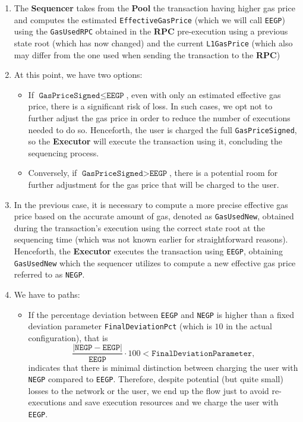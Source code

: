 \begin{enumerate}

\item The \textbf{Sequencer} takes from the \textbf{Pool} the transaction having higher gas price and computes the estimated \texttt{EffectiveGasPrice} (which we will call \texttt{EEGP}) using the \texttt{GasUsedRPC} obtained in the \textbf{RPC} pre-execution using a previous state root (which has now changed) and the current \texttt{L1GasPrice} (which also may differ from the one used when sending the transaction to the \textbf{RPC})

\item At this point, we have two options:

\begin{itemize}

\item If $\texttt{GasPriceSigned} \leq \texttt{EEGP}$, even with only an estimated effective gas price, there is a significant risk of loss. In such cases, we opt not to further adjust the gas price in order to reduce the number of executions needed to do so. Henceforth, the user is charged the full \texttt{GasPriceSigned}, so the \textbf{Executor} will execute the transaction using it, concluding the sequencing process.

\item Conversely, if $\texttt{GasPriceSigned} > \texttt{EEGP}$, there is a potential room for further adjustment for the gas price that will be charged to the user.

\end{itemize}

\item In the previous case, it is necessary to compute a more precise effective gas price based on the accurate amount of gas, denoted as \texttt{GasUsedNew}, obtained during the transaction's execution using the correct state root at the sequencing time (which was not known earlier for straightforward reasons). Henceforth, the \textbf{Executor} executes the transaction using \texttt{EEGP}, obtaining \texttt{GasUsedNew} which the sequencer utilizes to compute a new effective gas price referred to as \texttt{NEGP}.

\item We have to paths:

\begin{itemize}

\item If the percentage deviation between \texttt{EEGP} and \texttt{NEGP} is higher than a fixed deviation parameter \texttt{FinalDeviationPct} (which is $10$ in the actual configuration), that is
\[
\frac{\vert \texttt{NEGP} - \texttt{EEGP} \vert}{\texttt{EEGP}} \cdot 100 < \texttt{FinalDeviationParameter},
\]
indicates that there is minimal distinction between charging the user with \texttt{NEGP} compared to \texttt{EEGP}. Therefore, despite potential (but quite small) losses to the network or the user, we end up the flow just to avoid re-executions and save execution resources and we charge the user with \texttt{EEGP}.


\end{itemize}
\end{enumerate}
